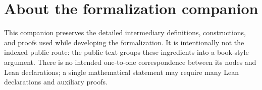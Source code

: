 

\chapter*{About the formalization companion}

This companion preserves the detailed intermediary definitions, constructions,
and proofs used while developing the formalization.  It is intentionally not
the indexed public route: the public text groups these ingredients into a
book-style argument.  There is no intended one-to-one correspondence between
its nodes and Lean declarations; a single mathematical statement may require
many Lean declarations and auxiliary proofs.




















